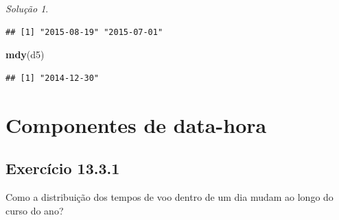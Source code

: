 \documentclass[
]{latex/krantz}
\newenvironment{Shaded}{\begin{snugshade}}{\end{snugshade}}
\newcommand{\FunctionTok}[1]{\textcolor[rgb]{0.13,0.29,0.53}{\textbf{#1}}}
\newcommand{\NormalTok}[1]{#1}
\theoremstyle{definition}
\theoremstyle{definition}
\theoremstyle{definition}
\theoremstyle{definition}
\theoremstyle{remark}
\newtheorem*{solution}{Solução}
\begin{document}
\begin{solution}
\begin{verbatim}
## [1] "2015-08-19" "2015-07-01"
\end{verbatim}

\begin{Shaded}
\begin{Highlighting}[]
\FunctionTok{mdy}\NormalTok{(d5)}
\end{Highlighting}
\end{Shaded}

\begin{verbatim}
## [1] "2014-12-30"
\end{verbatim}

\end{solution}

\hypertarget{componentes-de-data-hora}{%
\section{Componentes de data-hora}\label{componentes-de-data-hora}}

\hypertarget{exr13-3-1}{%
\subsection*{Exercício 13.3.1}\label{exr13-3-1}}

Como a distribuição dos tempos de voo dentro de um dia mudam ao longo do curso do ano?
\end{document}
